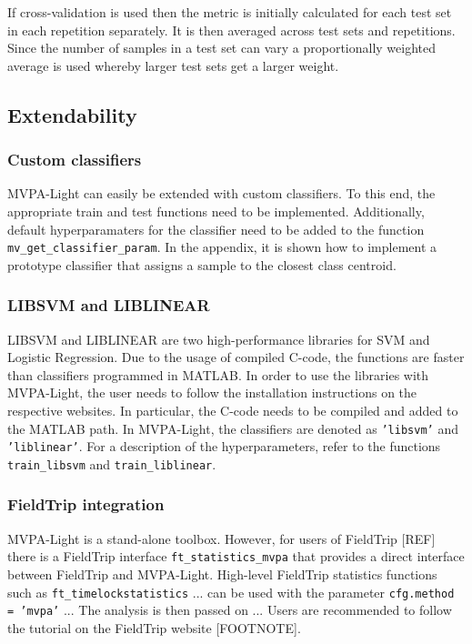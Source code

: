 \documentclass[utf8]{frontiersSCNS} %
\newcommand{\mvpa}{MVPA-Light}
\newcommand{\ttt}[1]{\texttt{#1}}
\begin{document}
If cross-validation is used then the metric is initially calculated for each test set in each repetition separately. It is then averaged across test sets and repetitions. Since the number of samples in a test set can vary a proportionally weighted average is used whereby larger test sets get a larger weight.

\subsection{Extendability}\label{sec:extendability}

\subsubsection{Custom classifiers}

\mvpa{} can easily be extended with custom classifiers. To this end, the appropriate train and test functions need to be implemented. Additionally, default hyperparamaters for the classifier need to be added to the function \ttt{mv\_get\_classifier\_param}. In the appendix, it is shown how to implement a prototype classifier that assigns a sample to the closest class centroid.

\subsubsection{LIBSVM and LIBLINEAR}

LIBSVM \cite{Chang2011LIBSVM:Machines} and LIBLINEAR \cite{Fan2008} are two high-performance libraries for SVM and Logistic Regression. Due to the usage of compiled C-code, the functions are faster than classifiers programmed in MATLAB. In order to use the libraries with \mvpa{}, the user needs to follow the installation instructions on the respective websites. In particular, the C-code needs to be compiled and added to the MATLAB path. In \mvpa{}, the classifiers are denoted as \ttt{'libsvm'} and \ttt{'liblinear'}. For a description of the hyperparameters, refer to the functions  \ttt{train\_libsvm} and \ttt{train\_liblinear}.

\subsubsection{FieldTrip integration}

\mvpa{} is a stand-alone toolbox. However, for users of FieldTrip [REF] there is a FieldTrip interface \ttt{ft\_statistics\_mvpa} that provides a direct interface between FieldTrip and \mvpa{}. High-level FieldTrip statistics functions such as \ttt{ft\_timelockstatistics} ... can be used with the parameter \ttt{cfg.method = 'mvpa'} ... The analysis is then passed on ... Users are recommended to follow the tutorial on the FieldTrip website [FOOTNOTE].
\end{document}
